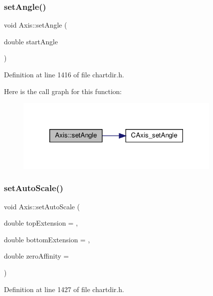 \subsubsection{\texorpdfstring{set\+Angle()}{setAngle()}}
{\footnotesize\ttfamily void Axis\+::set\+Angle (\begin{DoxyParamCaption}\item[{double}]{start\+Angle }\end{DoxyParamCaption})\hspace{0.3cm}{\ttfamily [inline]}}



Definition at line 1416 of file chartdir.\+h.

Here is the call graph for this function\+:
\nopagebreak
\begin{figure}[H]
\begin{center}
\leavevmode
\includegraphics[width=283pt]{class_axis_af2eb8f9d53b80736a336292d5a8ba0e9_cgraph}
\end{center}
\end{figure}
\mbox{\label{class_axis_a1be77ee03032a57d8a032fa118821b74}} 
\subsubsection{\texorpdfstring{set\+Auto\+Scale()}{setAutoScale()}}
{\footnotesize\ttfamily void Axis\+::set\+Auto\+Scale (\begin{DoxyParamCaption}\item[{double}]{top\+Extension = {},  }\item[{double}]{bottom\+Extension = {},  }\item[{double}]{zero\+Affinity = {} }\end{DoxyParamCaption})\hspace{0.3cm}{\ttfamily [inline]}}



Definition at line 1427 of file chartdir.\+h.

